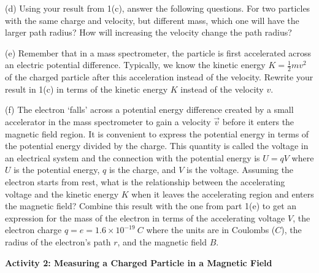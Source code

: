 (d) Using your result from 1(c), answer the following questions.
For two particles with the same charge and velocity, but different mass, which one will have the larger path radius?
How will increasing the velocity change the path radius?
\vspace{30mm}

(e) Remember that in a mass spectrometer, the particle is first accelerated
across an electric potential difference.
Typically, we know the kinetic energy $K=\frac{1}{2}mv^2$ of the charged particle after this
acceleration instead of the velocity.
Rewrite your result in 1(c) in terms of the kinetic energy $K$ instead of the
velocity $v$.
\vspace{45mm}

(f) The electron `falls' across a potential energy difference created by a small accelerator in the mass spectrometer
to gain a velocity $\vec v$ before it enters the magnetic field region.
It is convenient to express  the potential energy in terms of the potential energy divided by the charge.
This quantity is called the voltage in an electrical system and the connection with the potential energy
is $U=qV$ where $U$ is the potential energy, $q$ is the charge, and $V$ is the voltage.
Assuming the electron starts from rest, what is the relationship between the accelerating
voltage and the kinetic energy $K$ when it leaves the accelerating region and
enters the magnetic field? 
Combine this result with the one from part 1(e) to get an expression for 
the mass of the electron in terms of the accelerating voltage $V$, the
electron charge $q=e=1.6\times 10^{-19}~C$ where the units are in Coulombs ($C$), the radius of the electron's path $r$, and 
the magnetic field $B$.
\vspace{45mm}


\textbf{Activity 2: Measuring a Charged Particle in a Magnetic Field}


